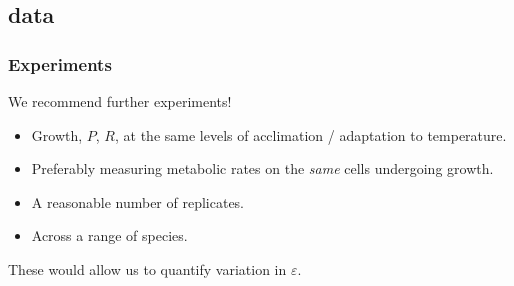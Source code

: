 \documentclass{beamer}
\begin{document}
\subsection{data}
\begin{frame}
  \frametitle{Experiments}

  \vspace{-2cm}
  We recommend further experiments!
  \begin{itemize}
    \item Growth, $P$, $R$, at the same levels of acclimation / adaptation to
      temperature.
    \item Preferably measuring metabolic rates on the \textit{same} cells
      undergoing growth.
    \item A reasonable number of replicates.
    \item Across a range of species.
  \end{itemize}

  These would allow us to quantify variation in $\varepsilon$.
  

\end{frame}
\end{document}
